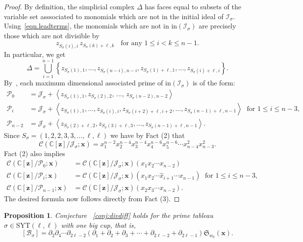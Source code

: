 \documentclass[11pt]{amsart}
\newtheorem{prop}[theorem]{Proposition}
\theoremstyle{remark}
\theoremstyle{remark}
\theoremstyle{definition}
\theoremstyle{definition}
\theoremstyle{definition}
\numberwithin{equation}{section}
\newcommand{\C}{\mathbb{C}}           %
\newcommand{\gs}{\sigma}
\newcommand{\cb}{\mathcal{B}}
\newcommand{\cc}{\mathcal{C}}
\newcommand{\ci}{\mathcal{I}}
\newcommand{\cj}{\mathcal{J}}
\newcommand{\cp}{\mathcal{P}} %
\newcommand{\SYT}{\mathrm{SYT}}
\begin{document}
\begin{proof}
By definition, the simplicial complex $\Delta$ has faces equal to subsets of the variable set asssociated to monomials which are not in the initial ideal of $\ci_\gs$. Using~\eqref{eqn.leadterms}, the monomials which are not in $\mathrm{in}(\ci_\gs)$ are precisely those which are not divisible by 
\[
z_{S_\gs(i),i}\,z_{S_\gs(k)+\ell,k} \;\; \text{ for any } 1\leq i <k \leq n-1.
\]
In particular, we get 
\[
\Delta = \bigcup_{i=1}^{n-1} \left\{ z_{S_\gs(1),1}, \ldots, z_{S_\gs(n-i), n-i}, z_{S_\gs(1)+\ell,1}, \ldots, z_{S_\gs(i)+\ell, i} \right\}.
\]
By~\cite[Theorem 1.7]{MillerSturmfels2005}, each maximum dimensional associated prime of $\mathrm{in}(\ci_\gs)$ is of the form: 
\begin{align*}
\cp_0 &= \cj_\gs+\left< z_{S_\gs(1),1}, z_{S_\gs(2),2},\, \ldots,\, z_{S_\gs(n-2),n-2} \right> \\
\cp_i &= \cj_\gs+\left< z_{S_\gs(1),1}, \ldots, z_{S_\gs(i),i}, z_{S_\gs(i+2)+\ell, i+2}, \ldots,  z_{S_\gs(n-1)+\ell, n-1} \right> \; \text{ for $1\leq i \leq n-3$} ,\; \\
\cp_{n-2} &= \cj_\gs+\left< z_{S_\gs(2)+\ell,2}, z_{S_\gs(3)+\ell,3}, \ldots, z_{S_\gs(n-1)+\ell,n-1} \right> .
\end{align*} 
Since $S_\gs=(1,2,2,3,3,\ldots, \ell, \ell )$ we have by Fact (2) that  
\[
\cc(\C[\mathbf{z}]/\cj_\gs; \mathbf{x}) = x_1^{n-2}x_2^{n-4}x_3^{n-4}x_4^{n-6}x_5^{n-6} \cdots x_{n-4}^2x_{n-3}^2.
\]
Fact (2) also implies 
\begin{align*}
\cc(\C[\mathbf{z}]/\cp_{0} ; \mathbf{x}) &= \cc(\C[\mathbf{z}]/\cj_\gs; \mathbf{x}) (x_1x_2 \cdots x_{n-2})\\
\cc(\C[\mathbf{z}]/\cp_{i} ; \mathbf{x}) &= \cc(\C[\mathbf{z}]/\cj_\gs; \mathbf{x}) (x_1x_2 \cdots \hat{x}_{i+1} \cdots x_{n-1})\; \text{ for $1\leq i \leq n-3$} ,\; \\
\cc(\C[\mathbf{z}]/\cp_{n-1} ; \mathbf{x}) &= \cc(\C[\mathbf{z}]/\cj_\gs; \mathbf{x}) (x_2x_3 \cdots x_{n-2}).
\end{align*}
The desired formula now follows directly from Fact (3).
\end{proof}




\begin{prop}\label{prop.divdiff.onebigcup}
Conjecture ~\ref{conj:divdiff} holds for the prime tableau $\gs\in \SYT(\ell, \ell)$ with one big cup, that is, 
\begin{equation}\label{conj:divbigcup}
[\cb_\gs]=\partial_2\partial_4\cdots\partial_{2\ell-2}\left(\partial_1+\partial_2+\partial_3+\cdots+\partial_{2\ell-2}+\partial_{2\ell-1}\right)\mathfrak{S}_{w_0} (\mathbf{x}).
\end{equation}
\end{prop}
\end{document}

